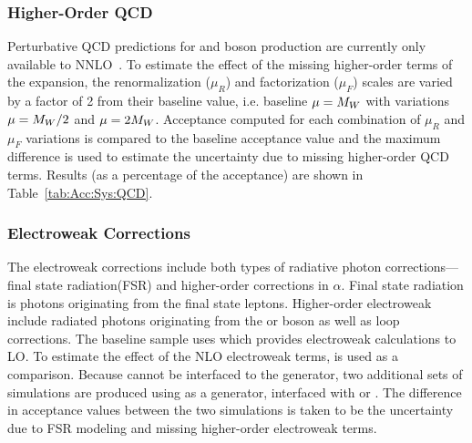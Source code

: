 
\subsubsection{Higher-Order QCD}
Perturbative QCD predictions for \W and \Z boson production are currently only available to NNLO~\cite{Melnikov:2006kv,Catani:2009sm}. To estimate the effect of the missing higher-order terms of the expansion, the renormalization ($\mu_R$) and factorization ($\mu_F$) scales are varied by a factor of 2 from their baseline value, i.e. baseline $\mu = M_{W}$ with variations $\mu=M_{W}/2$ and $\mu=2M_{W}$. Acceptance computed for each combination of $\mu_R$ and $\mu_F$ variations is compared to the baseline acceptance value and the maximum difference is used to estimate the uncertainty due to missing higher-order QCD terms. Results (as a percentage of the acceptance) are shown in Table~\ref{tab:Acc:Sys:QCD}.


\subsubsection{Electroweak Corrections}\label{ch:ewkcorr}
The electroweak corrections include both types of radiative photon corrections---final state radiation(FSR) and higher-order corrections in $\alpha$. Final state radiation is photons originating from the final state leptons. Higher-order electroweak include radiated photons originating from the \W or \Z boson as well as loop corrections. The baseline sample uses  which provides electroweak calculations to LO. To estimate the effect of the NLO electroweak terms, \PHOTOS \cite{Golonka:2005pn} is used as a comparison. Because \PHOTOS cannot be interfaced to the \aMCATNLO generator, two additional sets of simulations are produced using \POWHEG as a generator, interfaced with \PHOTOS or . The difference in acceptance values between the two simulations is taken to be the uncertainty due to FSR modeling and missing higher-order electroweak terms. 





% 
% 


